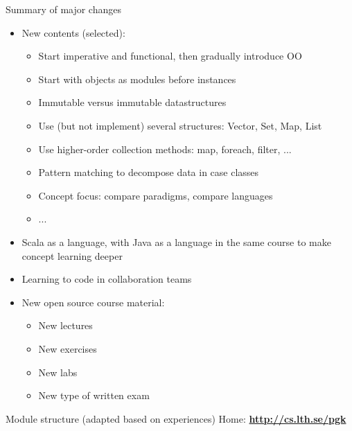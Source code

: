 \documentclass{lecturenotes}
\begin{document}
\begin{Slide}{Summary of major changes}\footnotesize
\begin{itemize}
\item New contents (selected):
\begin{itemize}\footnotesize
\item Start imperative and functional, then gradually introduce OO
\item Start with objects as modules before instances
\item Immutable versus immutable datastructures
\item Use (but not implement) several structures: Vector, Set, Map, List 
\item Use higher-order collection methods: map, foreach, filter, ...
\item Pattern matching to decompose data in case classes
\item Concept focus: compare paradigms, compare languages
\item ... 
\end{itemize}
\item Scala as a  language, with Java as a  language in the same course to make concept learning deeper
\item Learning to code in collaboration teams
\item New open source course material:
\begin{itemize}\footnotesize
\item New lectures
\item New exercises
\item New labs
\item New type of written exam
\end{itemize}
\end{itemize}
\end{Slide}

\begin{Slide}{Module structure (adapted based on experiences)}
Home: \textbf{\url{http://cs.lth.se/pgk}} \\ \vspace{1em}

\noindent\resizebox{0.8\columnwidth}{!}{\fontsize{8}{10}\selectfont

}
\end{Slide}
\end{document}
